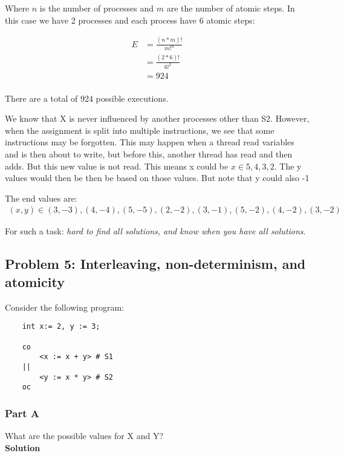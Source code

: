 Where $n$ is the number of processes and $m$ are the number of atomic steps. In this case we have 2 processes and each process have 6 atomic steps: 

\begin{align*}
    E &= \frac{(n*m)!}{m!^{n}} \\
      &= \frac{(2*6)!}{6!^{2}} \\
      &= 924 \\
\end{align*}

There are a total of 924 possible executions. 

We know that X is never influenced by another processes other than S2. 
However, when the assignment is split into multiple instructions, we see that some instructions may be forgotten.
This may happen when a thread read variables and is then about to write, but before this, another thread has read and then adds. But this new value is not read. 
This means x could be $x \in {5,4,3,2}$. The y values would then be then be based on those values. But note that y could also -1

The end values are: 
\begin{align*}
    (x,y) \in (3,-3), (4,-4), (5, -5), (2, -2), (3, -1), (5, -2), (4, -2), (3, -2)
\end{align*}

For such a task: \textit{hard to find all solutions, and know when you have all solutions}. 



\subsection{Problem 5: Interleaving, non-determinism, and atomicity}

Consider the following program:

\begin{lstlisting}
    int x:= 2, y := 3;

    co
        <x := x + y> # S1
    ||
        <y := x * y> # S2
    oc
\end{lstlisting}


\subsubsection{Part A}

What are the possible values for X and Y? \\

\textbf{Solution}

